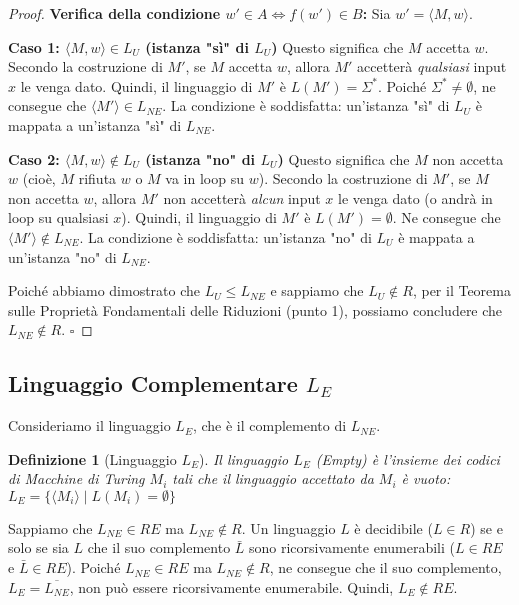 \documentclass[a4paper]{article}
\newcommand{\blankS}{\ensuremath{\square}}
\newtheorem{definition}[theorem]{Definizione}
\begin{document}
\begin{proof}
\textbf{Verifica della condizione $w' \in A \iff f(w') \in B$:}
Sia $w' = \langle M, w \rangle$.

\textbf{Caso 1: $\langle M, w \rangle \in L_U$ (istanza "sì" di $L_U$)}
Questo significa che $M$ accetta $w$.
Secondo la costruzione di $M'$, se $M$ accetta $w$, allora $M'$ accetterà \emph{qualsiasi} input $x$ le venga dato.
Quindi, il linguaggio di $M'$ è $L(M') = \Sigma^*$.
Poiché $\Sigma^* \neq \emptyset$, ne consegue che $\langle M' \rangle \in L_{NE}$.
La condizione è soddisfatta: un'istanza "sì" di $L_U$ è mappata a un'istanza "sì" di $L_{NE}$.

\textbf{Caso 2: $\langle M, w \rangle \notin L_U$ (istanza "no" di $L_U$)}
Questo significa che $M$ non accetta $w$ (cioè, $M$ rifiuta $w$ o $M$ va in loop su $w$).
Secondo la costruzione di $M'$, se $M$ non accetta $w$, allora $M'$ non accetterà \emph{alcun} input $x$ le venga dato (o andrà in loop su qualsiasi $x$).
Quindi, il linguaggio di $M'$ è $L(M') = \emptyset$.
Ne consegue che $\langle M' \rangle \notin L_{NE}$.
La condizione è soddisfatta: un'istanza "no" di $L_U$ è mappata a un'istanza "no" di $L_{NE}$.

Poiché abbiamo dimostrato che $L_U \le L_{NE}$ e sappiamo che $L_U \notin R$, per il Teorema sulle Proprietà Fondamentali delle Riduzioni (punto 1), possiamo concludere che $L_{NE} \notin R$.
$\blankS$
\end{proof}

\subsection{Linguaggio Complementare $L_E$}

Consideriamo il linguaggio $L_E$, che è il complemento di $L_{NE}$.
\begin{definition}[Linguaggio $L_E$]
Il linguaggio $L_E$ (Empty) è l'insieme dei codici di Macchine di Turing $M_i$ tali che il linguaggio accettato da $M_i$ è vuoto:
$L_E = \{ \langle M_i \rangle \mid L(M_i) = \emptyset \}$
\end{definition}

Sappiamo che $L_{NE} \in RE$ ma $L_{NE} \notin R$.
Un linguaggio $L$ è decidibile ($L \in R$) se e solo se sia $L$ che il suo complemento $\bar{L}$ sono ricorsivamente enumerabili ($L \in RE$ e $\bar{L} \in RE$).
Poiché $L_{NE} \in RE$ ma $L_{NE} \notin R$, ne consegue che il suo complemento, $L_E = \overline{L_{NE}}$, non può essere ricorsivamente enumerabile.
Quindi, $L_E \notin RE$.
\end{document}
